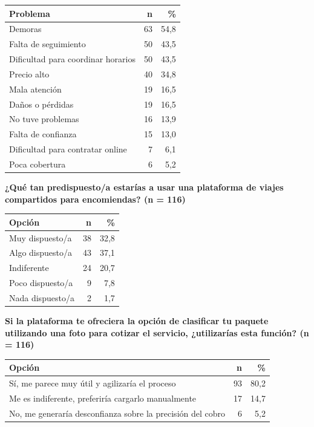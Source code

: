 \begin{center}
\begin{tabular}{lrr}
	\toprule
	\textbf{Problema} & \textbf{n} & \textbf{\%} \\
	\midrule
	Demoras                                  & 63 & 54,8 \\
	Falta de seguimiento                     & 50 & 43,5 \\
	Dificultad para coordinar horarios       & 50 & 43,5 \\
	Precio alto                              & 40 & 34,8 \\
	Mala atención                            & 19 & 16,5 \\
	Daños o pérdidas                         & 19 & 16,5 \\
	No tuve problemas                        & 16 & 13,9 \\
	Falta de confianza                       & 15 & 13,0 \\
	Dificultad para contratar online         &  7 &  6,1 \\
	Poca cobertura                           &  6 &  5,2 \\
	\bottomrule
\end{tabular}
\end{center}

\bigskip
\noindent\textbf{¿Qué tan predispuesto/a estarías a usar una plataforma de viajes compartidos para encomiendas? (n = 116)}

\begin{center}
\begin{tabular}{lrr}
	\toprule
	\textbf{Opción} & \textbf{n} & \textbf{\%} \\
	\midrule
	Muy dispuesto/a   & 38 & 32,8 \\
	Algo dispuesto/a  & 43 & 37,1 \\
	Indiferente       & 24 & 20,7 \\
	Poco dispuesto/a  &  9 &  7,8 \\
	Nada dispuesto/a  &  2 &  1,7 \\
	\bottomrule
\end{tabular}
\end{center}

\bigskip
\noindent\textbf{Si la plataforma te ofreciera la opción de clasificar tu paquete utilizando una foto para cotizar el servicio, ¿utilizarías esta función? (n = 116)}

\begin{center}
\begin{tabular}{lrr}
	\toprule
	\textbf{Opción} & \textbf{n} & \textbf{\%} \\
	\midrule
	Sí, me parece muy útil y agilizaría el proceso                & 93 & 80,2 \\
	Me es indiferente, preferiría cargarlo manualmente            & 17 & 14,7 \\
	No, me generaría desconfianza sobre la precisión del cobro    &  6 &  5,2 \\
	\bottomrule
\end{tabular}
\end{center}

